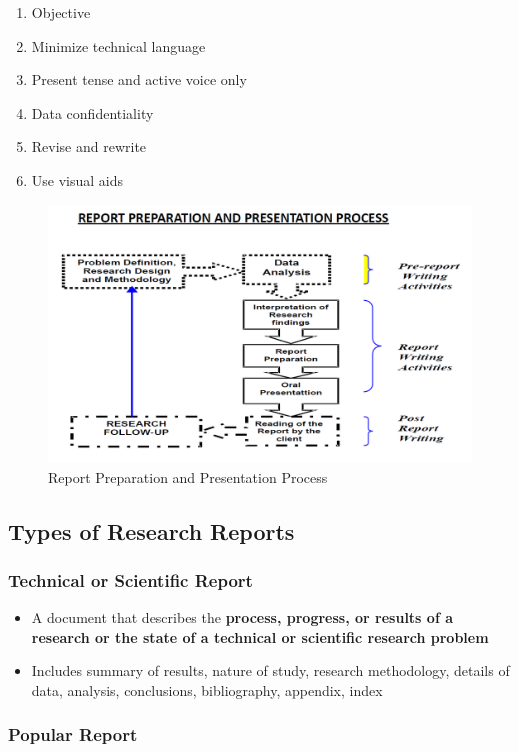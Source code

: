 \documentclass{article}
\begin{document}
\begin{enumerate}
    \item Objective
    \item Minimize technical language
    \item Present tense and active voice only
    \item Data confidentiality
    \item Revise and rewrite
    \item Use visual aids
\end{enumerate}

\begin{figure}[htp]
    \centering
    \includegraphics[width=0.7 \linewidth]{img/report-process.png}
    \caption{Report Preparation and Presentation Process}
    \label{fig:report-process}
\end{figure}

\subsection{Types of Research Reports}

\subsubsection{Technical or Scientific Report}

\begin{itemize}
    \item A document that describes the \textbf{process, progress, or results of a research or the state of a technical or scientific research problem}
    \item Includes summary of results, nature of study, research methodology, details of data, analysis, conclusions, bibliography, appendix, index
\end{itemize}

\subsubsection{Popular Report}
\end{document}
